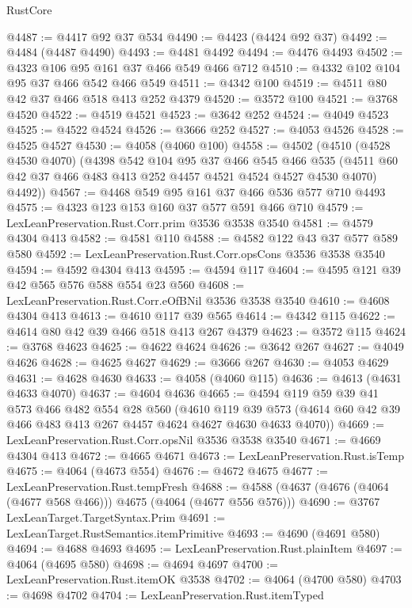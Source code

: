 \begin{lexlean}{RustCore}
\begin{coremodule}
@4487 := @4417 @92 @37 @534
@4490 := @4423 (@4424 @92 @37)
@4492 := @4484 (@4487 @4490)
@4493 := @4481 @4492
@4494 := @4476 @4493
@4502 := @4323 @106 @95 @161 @37 @466 @549 @466 @712
@4510 := @4332 @102 @104 @95 @37 @466 @542 @466 @549
@4511 := @4342 @100
@4519 := @4511 @80 @42 @37 @466 @518 @413 @252 @4379
@4520 := @3572 @100
@4521 := @3768 @4520
@4522 := @4519 @4521
@4523 := @3642 @252
@4524 := @4049 @4523
@4525 := @4522 @4524
@4526 := @3666 @252
@4527 := @4053 @4526
@4528 := @4525 @4527
@4530 := @4058 (@4060 @100)
@4558 := @4502
    (@4510
      (@4528 @4530 @4070)
      (@4398
        @542
        @104
        @95
        @37
        @466
        @545
        @466
        @535
        (@4511 @60 @42 @37 @466 @483 @413 @252 @4457 @4521 @4524 @4527 @4530 @4070)
        @4492))
@4567 := @4468 @549 @95 @161 @37 @466 @536 @577 @710 @4493
@4575 := @4323 @123 @153 @160 @37 @577 @591 @466 @710
@4579 := LexLeanPreservation.Rust.Corr.prim @3536 @3538 @3540
@4581 := @4579 @4304 @413
@4582 := @4581 @110
@4588 := @4582 @122 @43 @37 @577 @589 @580
@4592 := LexLeanPreservation.Rust.Corr.opsCons @3536 @3538 @3540
@4594 := @4592 @4304 @413
@4595 := @4594 @117
@4604 := @4595 @121 @39 @42 @565 @576 @588 @554 @23 @560
@4608 := LexLeanPreservation.Rust.Corr.eOfBNil @3536 @3538 @3540
@4610 := @4608 @4304 @413
@4613 := @4610 @117 @39 @565
@4614 := @4342 @115
@4622 := @4614 @80 @42 @39 @466 @518 @413 @267 @4379
@4623 := @3572 @115
@4624 := @3768 @4623
@4625 := @4622 @4624
@4626 := @3642 @267
@4627 := @4049 @4626
@4628 := @4625 @4627
@4629 := @3666 @267
@4630 := @4053 @4629
@4631 := @4628 @4630
@4633 := @4058 (@4060 @115)
@4636 := @4613 (@4631 @4633 @4070)
@4637 := @4604 @4636
@4665 := @4594
    @119
    @59
    @39
    @41
    @573
    @466
    @482
    @554
    @28
    @560
    (@4610
      @119
      @39
      @573
      (@4614 @60 @42 @39 @466 @483 @413 @267 @4457 @4624 @4627 @4630 @4633 @4070))
@4669 := LexLeanPreservation.Rust.Corr.opsNil @3536 @3538 @3540
@4671 := @4669 @4304 @413
@4672 := @4665 @4671
@4673 := LexLeanPreservation.Rust.isTemp
@4675 := @4064 (@4673 @554)
@4676 := @4672 @4675
@4677 := LexLeanPreservation.Rust.tempFresh
@4688 := @4588 (@4637 (@4676 (@4064 (@4677 @568 @466))) @4675 (@4064 (@4677 @556 @576)))
@4690 := @3767 LexLeanTarget.TargetSyntax.Prim
@4691 := LexLeanTarget.RustSemantics.itemPrimitive
@4693 := @4690 (@4691 @580)
@4694 := @4688 @4693
@4695 := LexLeanPreservation.Rust.plainItem
@4697 := @4064 (@4695 @580)
@4698 := @4694 @4697
@4700 := LexLeanPreservation.Rust.itemOK @3538
@4702 := @4064 (@4700 @580)
@4703 := @4698 @4702
@4704 := LexLeanPreservation.Rust.itemTyped

\end{coremodule}
\end{lexlean}

